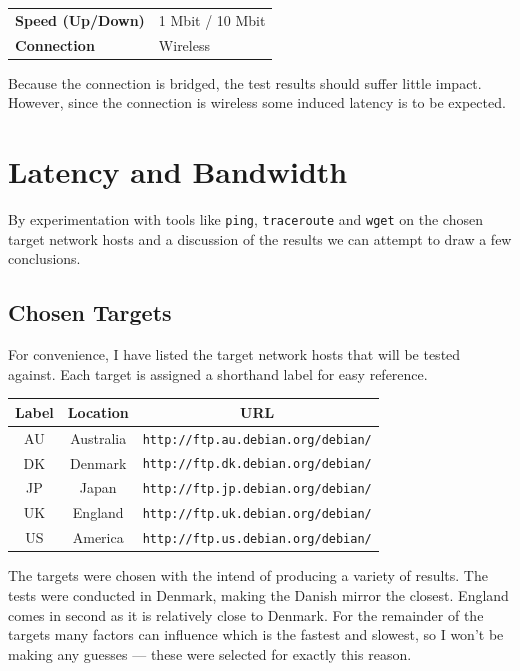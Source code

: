 \documentclass{acm_proc_article-sp}
\newcommand{\prog}[1]{{\tt #1}}
\begin{document}
\begin{tabular}{ll}
    {\bf Speed (Up/Down)}   & 1 Mbit / 10 Mbit \\
    {\bf Connection}        & Wireless \\
\end{tabular}

Because the connection is bridged, the test results should suffer little
impact. However, since the connection is wireless some induced latency is to
be expected.

\section{Latency and Bandwidth}
\label{sec:latency-and-bandwidth}
By experimentation with tools like \prog{ping}, \prog{traceroute} and
\prog{wget} on the chosen target network hosts and a discussion of the
results we can attempt to draw a few conclusions.

\subsection{Chosen Targets}
\label{sec:latency-and-bandwidth|sub:chosen-targets}
For convenience, I have listed the target network hosts that will be tested
against. Each target is assigned a shorthand label for easy reference.
\begin{center}
    \begin{tabular}{|c|c|c|}
        \hline
        {\bf Label}     & {\bf Location}    & {\bf URL} \\ \hline
        AU  & Australia & {\tt http://ftp.au.debian.org/debian/} \\ \hline
        DK  & Denmark   & {\tt http://ftp.dk.debian.org/debian/} \\ \hline
        JP  & Japan     & {\tt http://ftp.jp.debian.org/debian/} \\ \hline
        UK  & England   & {\tt http://ftp.uk.debian.org/debian/} \\ \hline
        US  & America   & {\tt http://ftp.us.debian.org/debian/} \\ \hline
    \end{tabular}
\end{center}
The targets were chosen with the intend of producing a variety of results. The
tests were conducted in Denmark, making the Danish mirror the closest. England
comes in second as it is relatively close to Denmark. For the remainder of the
targets many factors can influence which is the fastest and slowest, so I
won't be making any guesses --- these were selected for exactly this reason.
\end{document}
